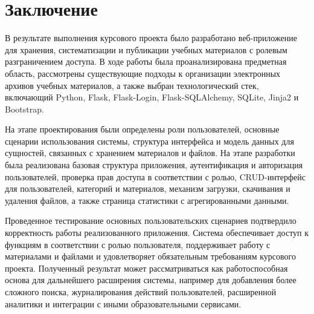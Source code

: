 \section*{Заключение}

В результате выполнения курсового проекта было разработано веб-приложение для хранения, систематизации и публикации учебных материалов с ролевым разграничением доступа. В ходе работы была проанализирована предметная область, рассмотрены существующие подходы к организации электронных архивов учебных материалов, а также выбран технологический стек, включающий Python, Flask, Flask-Login, Flask-SQLAlchemy, SQLite, Jinja2 и Bootstrap.

На этапе проектирования были определены роли пользователей, основные сценарии использования системы, структура интерфейса и модель данных для сущностей, связанных с хранением материалов и файлов. На этапе разработки была реализована базовая структура приложения, аутентификация и авторизация пользователей, проверка прав доступа в соответствии с ролью, CRUD-интерфейс для пользователей, категорий и материалов, механизм загрузки, скачивания и удаления файлов, а также страница статистики с агрегированными данными.

Проведенное тестирование основных пользовательских сценариев подтвердило корректность работы реализованного приложения. Система обеспечивает доступ к функциям в соответствии с ролью пользователя, поддерживает работу с материалами и файлами и удовлетворяет обязательным требованиям курсового проекта. Полученный результат может рассматриваться как работоспособная основа для дальнейшего расширения системы, например для добавления более сложного поиска, журналирования действий пользователей, расширенной аналитики и интеграции с иными образовательными сервисами.